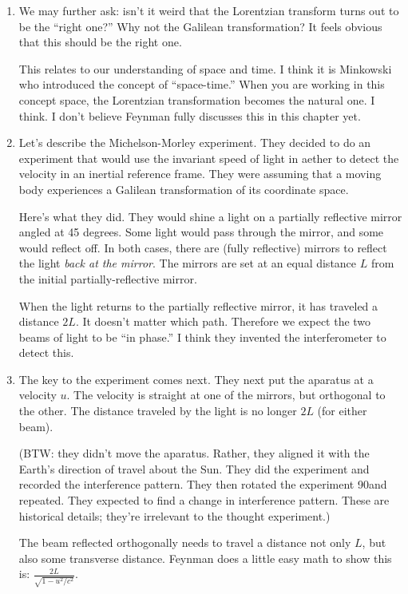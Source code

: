 \begin{enumerate}
  \item We may further ask: isn't it weird that the Lorentzian transform
  turns out to be the ``right one?'' Why not the Galilean
  transformation? It feels obvious that this should be the right one.

  This relates to our understanding of space and time. I think it is
  Minkowski who introduced the concept of ``space-time.'' When you are
  working in this concept space, the Lorentzian transformation becomes
  the natural one. I think. I don't believe Feynman fully discusses this
  in this chapter yet.

  \item Let's describe the Michelson-Morley experiment. They decided to
  do an experiment that would use the invariant speed of light in aether
  to detect the velocity in an inertial reference frame. They were
  assuming that a moving body experiences a Galilean transformation of
  its coordinate space.

  Here's what they did. They would shine a light on a partially
  reflective mirror angled at 45 degrees. Some light would pass through
  the mirror, and some would reflect off. In both cases, there are
  (fully reflective) mirrors to reflect the light \emph{back at the
  mirror}. The mirrors are set at an equal distance $L$ from the initial
  partially-reflective mirror.

  When the light returns to the partially reflective mirror, it has
  traveled a distance $2L$. It doesn't matter which path. Therefore we
  expect the two beams of light to be ``in phase.'' I think they
  invented the interferometer to detect this.

  \item The key to the experiment comes next. They next put the aparatus
  at a velocity $u$. The velocity is straight at one of the mirrors, but
  orthogonal to the other. The distance traveled by the light is no
  longer $2L$ (for either beam).

  (BTW: they didn't move the aparatus. Rather, they aligned it with the
  Earth's direction of travel about the Sun. They did the experiment and
  recorded the interference pattern. They then rotated the experiment
  90\degree and repeated. They expected to find a change in interference
  pattern. These are historical details; they're irrelevant to the
  thought experiment.)

  The beam reflected orthogonally needs to travel a distance not only
  $L$, but also some transverse distance. Feynman does a little easy
  math to show this is: $\frac{2L}{\sqrt{1 - u^2/c^2}}$.


\end{enumerate}
